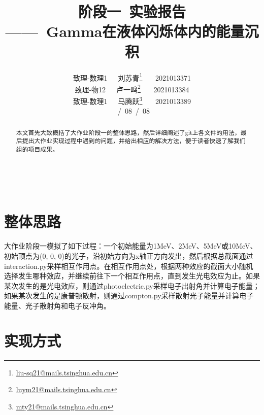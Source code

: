 \documentclass[12pt,a4paper]{article}%
\title{\fontsize{24pt}{24pt}\selectfont%
	{\heiti%
		阶段一~实验报告}\\[0.5ex] %
	{\fontsize{16pt}{24pt}\selectfont%
		\heiti——~Gamma在液体闪烁体内的能量沉积}}%
\author{\fontsize{12pt}{18pt}\selectfont%
	{\fangsong%
		致理-数理1~~~刘苏青}\thanks{\href{mailto:liu-sq21@mails.tsinghua.edu.cn}{liu-sq21@mails.tsinghua.edu.cn}}%
        {\fangsong
        ~~~2021013371}\\
        {\fontsize{12pt}{18pt}\selectfont
        {\fangsong
        致理-物12~~~卢一鸣\thanks{\href{mailto:luym21@mails.tsinghua.edu.cn}{luym21@mails.tsinghua.edu.cn}}}
        {\fangsong
        ~~~2021013384}}\\
        {\fontsize{12pt}{18pt}\selectfont
        {\fangsong
        致理-数理1~~~马腾跃\thanks{\href{mailto:mty21@mails.tsinghua.edu.cn}{mty21@mails.tsinghua.edu.cn}}}
        {\fangsong
        ~~~2021013389}}\\
	\fontsize{10.5pt}{15.75pt}\selectfont%
	{\fangsong%
		2023~/~08~/~08}}
\date{}%
\begin{document}
	\maketitle%
	\lhead{}%
	\chead{}%
	\rhead{}%
	\lfoot{}%
	\cfoot{\thepage}%
	\rfoot{}%
	\begin{abstract}
		\fangsong 本文首先大致概括了大作业阶段一的整体思路，然后详细阐述了git上各文件的用法，最后提出大作业实现过程中遇到的问题，并给出相应的解决方法，便于读者快速了解我们组的项目成果。
	\end{abstract}
	
	\begin{adjustwidth}{1.06cm}{1.06cm}
		\fontsize{10.5pt}{15.75pt}\\
	\end{adjustwidth}
 

	\newpage
        \tableofcontents
        \newpage


\section{整体思路}
    大作业阶段一模拟了如下过程：一个初始能量为1MeV、2MeV、5MeV或10MeV、初始顶点为(0, 0, 0)的光子，沿初始方向为x轴正方向发出，然后根据总截面通过interaction.py采样相互作用点。在相互作用点处，根据两种效应的截面大小随机选择发生哪种效应，并继续前往下一个相互作用点，直到发生光电效应为止。如果某次发生的是光电效应，则通过photoelectric.py采样电子出射角并计算电子能量；如果某次发生的是康普顿散射，则通过compton.py采样散射光子能量并计算电子能量、光子散射角和电子反冲角。
    \newpage
\section{实现方式}
\end{document}
